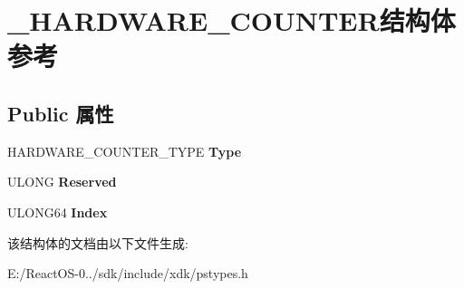 \hypertarget{struct___h_a_r_d_w_a_r_e___c_o_u_n_t_e_r}{}\section{\+\_\+\+H\+A\+R\+D\+W\+A\+R\+E\+\_\+\+C\+O\+U\+N\+T\+E\+R结构体 参考}
\label{struct___h_a_r_d_w_a_r_e___c_o_u_n_t_e_r}
\subsection*{Public 属性}
\begin{DoxyCompactItemize}
\item 
\mbox{\label{struct___h_a_r_d_w_a_r_e___c_o_u_n_t_e_r_a50ef6825abad82f6aa794a63592d3ec9}} 
H\+A\+R\+D\+W\+A\+R\+E\+\_\+\+C\+O\+U\+N\+T\+E\+R\+\_\+\+T\+Y\+PE {\bfseries Type}
\item 
\mbox{\label{struct___h_a_r_d_w_a_r_e___c_o_u_n_t_e_r_ae79f9b28c833b5e93db50e62c7705245}} 
U\+L\+O\+NG {\bfseries Reserved}
\item 
\mbox{\label{struct___h_a_r_d_w_a_r_e___c_o_u_n_t_e_r_a676efe82bb0eced3ca93159b7f796218}} 
U\+L\+O\+N\+G64 {\bfseries Index}
\end{DoxyCompactItemize}


该结构体的文档由以下文件生成\+:\begin{DoxyCompactItemize}
\item 
E\+:/\+React\+O\+S-\/0../sdk/include/xdk/pstypes.\+h\end{DoxyCompactItemize}
